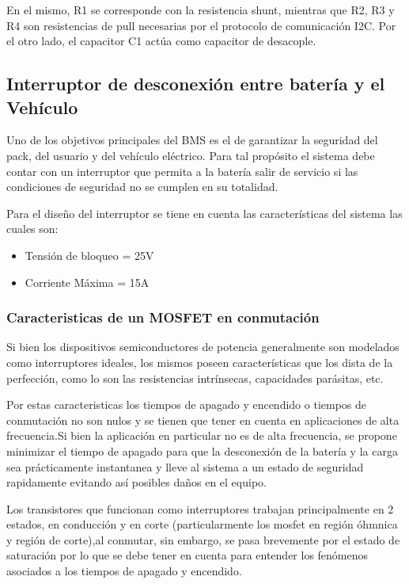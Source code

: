 \documentclass[10pt,a4paper]{article}
\begin{document}
\begin{itemize}
En el mismo, R1 se corresponde con la resistencia shunt, mientras que R2, R3 y
R4 son resistencias de pull necesarias por el protocolo de comunicaci\'on I2C.
Por el otro lado, el capacitor C1 act\'ua como capacitor de desacople.

\subsection{Interruptor de desconexión entre batería y el Vehículo}

Uno de los objetivos principales del BMS es el de garantizar la seguridad del
pack, del usuario y del vehículo eléctrico. Para tal propósito el sistema debe
contar con un interruptor que permita a la batería salir de servicio si las
condiciones de seguridad no se cumplen en su totalidad.

Para el diseño del interruptor se tiene en cuenta las características del
sistema las cuales son:

\begin{itemize}
	\item Tensión de bloqueo = 25V
	\item Corriente Máxima = 15A
\end{itemize}

\subsubsection{Caracteristicas de un MOSFET en conmutación}

Si bien los dispositivos semiconductores de potencia generalmente son modelados
como interruptores ideales, los mismos poseen características que los dista de
la perfección, como lo son las resistencias intrínsecas, capacidades parásitas,
etc.

Por estas caracteristicas los tiempos de apagado y encendido o tiempos de
conmutación no son nulos y se tienen que tener en cuenta en aplicaciones de alta
frecuencia.Si bien la aplicación en particular no es de alta frecuencia, se
propone minimizar el tiempo de apagado para que la desconexión de la batería y
la carga sea prácticamente instantanea y lleve al sistema a un estado de
seguridad rapidamente evitando así posibles daños en el equipo.

Los transistores que funcionan como interruptores trabajan principalmente en 2
estados, en conducción y en corte (particularmente los mosfet en región
\'ohmnica y región de corte),al conmutar, sin embargo, se pasa brevemente por el 
estado de saturación por lo que se debe tener en cuenta para entender los 
fenómenos asociados a los tiempos de apagado y encendido.


\end{itemize}
\end{document}
